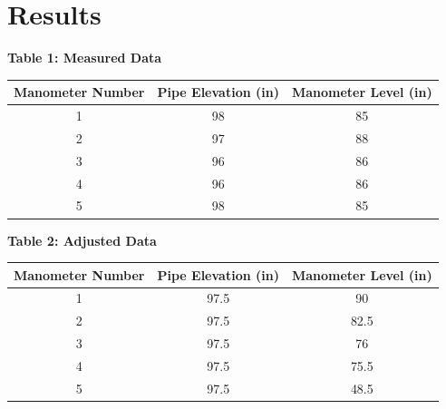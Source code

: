 \documentclass{article}
\begin{document}
\section{Results} 
\begin{center}

    {\large{\bf Table 1: Measured Data\\}}
    \vspace{3mm}

    \begin{tabular}{|ccc|} 
        \hline
        \textbf{Manometer Number} & \textbf{Pipe Elevation (in)} & \textbf{Manometer Level (in)}  \\ 
        \hline
        1                         & 98                           & 85                             \\
        2                         & 97                           & 88                             \\
        3                         & 96                           & 86                             \\
        4                         & 96                           & 86                             \\
        5                         & 98                           & 85                             \\
        \hline
    \end{tabular}

    \vspace{10mm}
    {\large{\bf Table 2: Adjusted Data\\}}
    \vspace{3mm}

    \begin{tabular}{|ccc|} 
        \hline
        \textbf{Manometer Number} & \textbf{Pipe Elevation (in)} & \textbf{Manometer Level (in)}  \\ 
        \hline
        1                         & 97.5                         & 90                             \\
        2                         & 97.5                         & 82.5                           \\
        3                         & 97.5                         & 76                             \\
        4                         & 97.5                         & 75.5                           \\
        5                         & 97.5                         & 48.5                           \\
        \hline
    \end{tabular}


\end{center}
\end{document}
